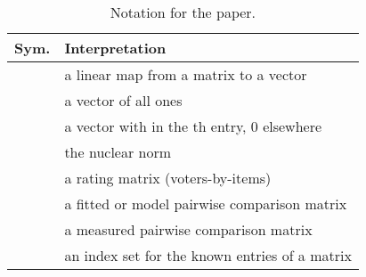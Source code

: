\documentclass{sig-alternate}
\begin{document}
\begin{table}
\caption{Notation for the paper.}
\label{tab:notation}
\setlength{\tabcolsep}{1ex}
\renewcommand{\arraystretch}{1.2}
\begin{tabularx}{\linewidth}{cX}
\toprule
  \textbf{Sym.} & \textbf{Interpretation} 
\\ \midrule
    & a linear map from a matrix to a vector 
\\  & a vector of all ones
\\  & a vector with  in the th entry, 0 elsewhere
\\  & the nuclear norm
\\  & a rating matrix (voters-by-items)
\\  & a fitted or model pairwise comparison matrix 
\\  & a measured pairwise comparison matrix
\\  & an index set for the known entries of a matrix
\\ \bottomrule
\end{tabularx}
\end{table}
\end{document}
